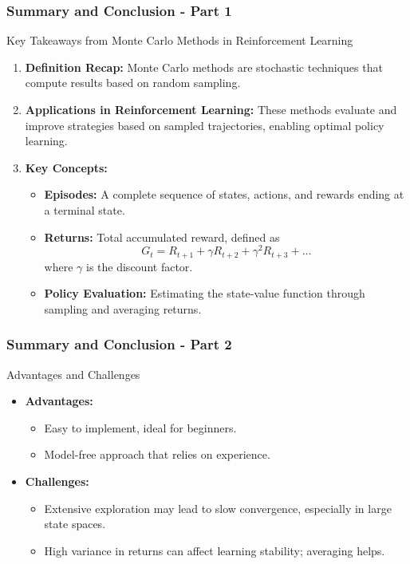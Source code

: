 \documentclass[aspectratio=169]{beamer}
\begin{document}
\begin{frame}[fragile]
    \frametitle{Summary and Conclusion - Part 1}
    \begin{block}{Key Takeaways from Monte Carlo Methods in Reinforcement Learning}
        \begin{enumerate}
            \item \textbf{Definition Recap:} 
                Monte Carlo methods are stochastic techniques that compute results based on random sampling.
            \item \textbf{Applications in Reinforcement Learning:}
                These methods evaluate and improve strategies based on sampled trajectories, enabling optimal policy learning.
            \item \textbf{Key Concepts:}
                \begin{itemize}
                    \item \textbf{Episodes:} A complete sequence of states, actions, and rewards ending at a terminal state.
                    \item \textbf{Returns:} Total accumulated reward, defined as
                    \begin{equation}
                        G_t = R_{t+1} + \gamma R_{t+2} + \gamma^2 R_{t+3} + \ldots
                    \end{equation}
                    where $\gamma$ is the discount factor.
                    \item \textbf{Policy Evaluation:} Estimating the state-value function through sampling and averaging returns.
                \end{itemize}
        \end{enumerate}
    \end{block}
\end{frame}

\begin{frame}[fragile]
    \frametitle{Summary and Conclusion - Part 2}
    \begin{block}{Advantages and Challenges}
        \begin{itemize}
            \item \textbf{Advantages:}
                \begin{itemize}
                    \item Easy to implement, ideal for beginners.
                    \item Model-free approach that relies on experience.
                \end{itemize}
            \item \textbf{Challenges:}
                \begin{itemize}
                    \item Extensive exploration may lead to slow convergence, especially in large state spaces.
                    \item High variance in returns can affect learning stability; averaging helps.
                \end{itemize}
        \end{itemize}
    \end{block}
\end{frame}
\end{document}

